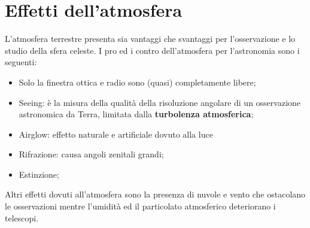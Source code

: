 \documentclass[a4paper, oneside]{book}
\begin{document}
\chapter{Effetti dell'atmosfera}
L'atmosfera terrestre presenta sia vantaggi che svantaggi per l'osservazione e lo
studio della sfera celeste. I pro ed i contro dell'atmosfera per
l'astronomia sono i seguenti:
\begin{itemize}
    \item Solo la finestra ottica e radio sono (quasi) completamente libere;
    \item Seeing: è la misura della qualità della risoluzione angolare di un 
    osservazione astronomica da Terra, limitata dalla \textbf{turbolenza atmosferica};
    \item Airglow: effetto naturale e artificiale dovuto alla luce
    \item Rifrazione: causa angoli zenitali grandi;
    \item Estinzione;
\end{itemize}
Altri effetti dovuti all'atmosfera sono la presenza di nuvole e vento che ostacolano le osservazioni 
mentre l'umidità ed il particolato atmosferico deteriorano i telescopi. 
\end{document}
